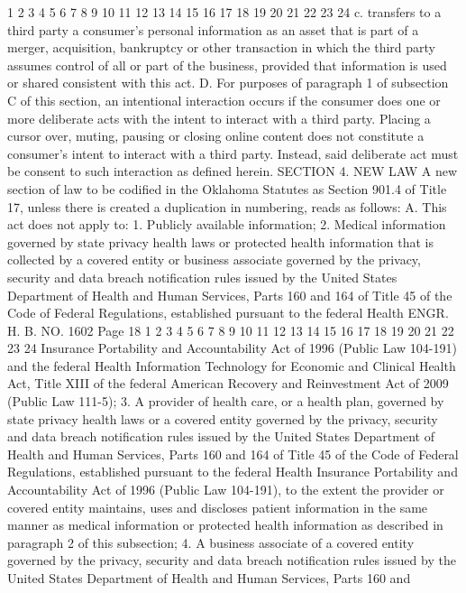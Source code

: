 1
2
3
4
5
6
7
8
9
10
11
12
13
14
15
16
17
18
19
20
21
22
23
24
c. transfers to a third party a consumer's personal
information as an asset that is part of a merger,
acquisition, bankruptcy or other transaction in which
the third party assumes control of all or part of the
business, provided that information is used or shared
consistent with this act.
D. For purposes of paragraph 1 of subsection C of this section,
an intentional interaction occurs if the consumer does one or more
deliberate acts with the intent to interact with a third party.
Placing a cursor over, muting, pausing or closing online content
does not constitute a consumer's intent to interact with a third
party. Instead, said deliberate act must be consent to such
interaction as defined herein.
SECTION 4. NEW LAW A new section of law to be codified
in the Oklahoma Statutes as Section 901.4 of Title 17, unless there
is created a duplication in numbering, reads as follows:
A. This act does not apply to:
1. Publicly available information;
2. Medical information governed by state privacy health laws or
protected health information that is collected by a covered entity
or business associate governed by the privacy, security and data
breach notification rules issued by the United States Department of
Health and Human Services, Parts 160 and 164 of Title 45 of the Code
of Federal Regulations, established pursuant to the federal Health 
ENGR. H. B. NO. 1602 Page 18
1
2
3
4
5
6
7
8
9
10
11
12
13
14
15
16
17
18
19
20
21
22
23
24
Insurance Portability and Accountability Act of 1996 (Public Law
104-191) and the federal Health Information Technology for Economic
and Clinical Health Act, Title XIII of the federal American Recovery
and Reinvestment Act of 2009 (Public Law 111-5);
3. A provider of health care, or a health plan, governed by
state privacy health laws or a covered entity governed by the
privacy, security and data breach notification rules issued by the
United States Department of Health and Human Services, Parts 160 and
164 of Title 45 of the Code of Federal Regulations, established
pursuant to the federal Health Insurance Portability and
Accountability Act of 1996 (Public Law 104-191), to the extent the
provider or covered entity maintains, uses and discloses patient
information in the same manner as medical information or protected
health information as described in paragraph 2 of this subsection;
4. A business associate of a covered entity governed by the
privacy, security and data breach notification rules issued by the
United States Department of Health and Human Services, Parts 160 and
